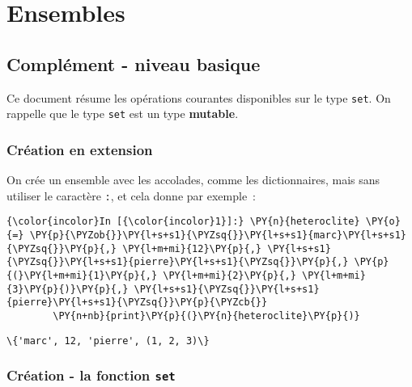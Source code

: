     
    
    
    

    

    \hypertarget{ensembles}{%
\section{Ensembles}\label{ensembles}}

    \hypertarget{compluxe9ment---niveau-basique}{%
\subsection{Complément - niveau
basique}\label{compluxe9ment---niveau-basique}}

    Ce document résume les opérations courantes disponibles sur le type
\texttt{set}. On rappelle que le type \texttt{set} est un type
\textbf{mutable}.

    \hypertarget{cruxe9ation-en-extension}{%
\subsubsection{Création en extension}\label{cruxe9ation-en-extension}}

    On crée un ensemble avec les accolades, comme les dictionnaires, mais
sans utiliser le caractère \texttt{:}, et cela donne par exemple~:

    \begin{Verbatim}[commandchars=\\\{\},frame=single,framerule=0.3mm,rulecolor=\color{cellframecolor}]
{\color{incolor}In [{\color{incolor}1}]:} \PY{n}{heteroclite} \PY{o}{=} \PY{p}{\PYZob{}}\PY{l+s+s1}{\PYZsq{}}\PY{l+s+s1}{marc}\PY{l+s+s1}{\PYZsq{}}\PY{p}{,} \PY{l+m+mi}{12}\PY{p}{,} \PY{l+s+s1}{\PYZsq{}}\PY{l+s+s1}{pierre}\PY{l+s+s1}{\PYZsq{}}\PY{p}{,} \PY{p}{(}\PY{l+m+mi}{1}\PY{p}{,} \PY{l+m+mi}{2}\PY{p}{,} \PY{l+m+mi}{3}\PY{p}{)}\PY{p}{,} \PY{l+s+s1}{\PYZsq{}}\PY{l+s+s1}{pierre}\PY{l+s+s1}{\PYZsq{}}\PY{p}{\PYZcb{}}
        \PY{n+nb}{print}\PY{p}{(}\PY{n}{heteroclite}\PY{p}{)}
\end{Verbatim}


    \begin{Verbatim}[commandchars=\\\{\},frame=single,framerule=0.3mm,rulecolor=\color{cellframecolor}]
\{'marc', 12, 'pierre', (1, 2, 3)\}
\end{Verbatim}

    \hypertarget{cruxe9ation---la-fonction-set}{%
\subsubsection{\texorpdfstring{Création - la fonction
\texttt{set}}{Création - la fonction set}}\label{cruxe9ation---la-fonction-set}}


